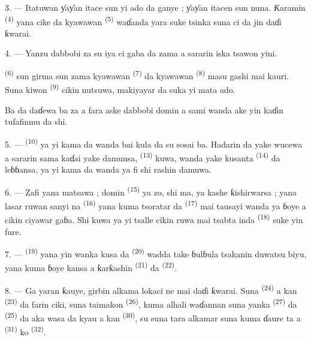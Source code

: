 3. --- Itatuwan ƴaƴan itace sun yi ado da ganye ; ƴaƴan itacen sun
nuna. Ƙaramin  \textsuperscript{(4)} yana cike da
kyawawan  \textsuperscript{(5)} waɗanda yara suke tsinka
suna ci da jin daɗi ƙwarai.

4. --- Yanzu dabbobi za su iya ci gaba da zama a sararin iska tsawon
yini.

 \textsuperscript{(6)} sun girma sun zama kyawawan
 \textsuperscript{(7)} da kyawawan 
\textsuperscript{(8)} masu gashi mai kauri. Suna kiwon 
 \textsuperscript{(9)} cikin nutsuwa, makiyayar da
 suka yi mata ado.

Ba da daɗewa ba za a fara aske  dabbobi domin a sami
 wanda ake yin kaɗin tufafinmu da shi.

\VUsaut{5.0mm}
\VUsaut{3.4mm}

5. ---  \textsuperscript{(10)} ya yi kama da wanda bai
kula da su sosai ba. Hadarin da yake wucewa a sararin sama kaɗai yake
damunsa,  \textsuperscript{(13)} kuwa, wanda
yake kusanta  \textsuperscript{(14)} da leɓɓansa, ya yi
kama da wanda ya fi shi rashin damuwa.

6. --- Zafi yana matsawa ; domin  \textsuperscript{(15)}
ya zo, shi ma, ya kashe ƙishirwarsa ; yana lasar ruwan sanyi na
 \textsuperscript{(16)} yana kuma tsoratar da
 \textsuperscript{(17)} mai tausayi wanda ya ɓoye a
cikin ciyawar gaɓa. Shi kuwa ya yi tsalle cikin ruwa mai tsabta inda
 \textsuperscript{(18)} suke yin fure.

7. ---  \textsuperscript{(19)} yana yin wanka
kusa da  \textsuperscript{(20)} wadda take
ɓulɓula tsakanin duwatsu biyu, yana kuma ɓoye kansa a ƙarƙashin
 \textsuperscript{(21)} da 
\textsuperscript{(22)}.

\VUsaut{5.0mm}
\VUsaut{3.4mm}

8. --- Ga yaran ƙauye, girbin alkama lokaci ne mai daɗi ƙwarai. Suna
\textsuperscript{(24)} a kan 
\textsuperscript{(23)} da farin ciki, suna taimakon 
\textsuperscript{(26)}, kuma alhali waɗannan suna yanka  \textsuperscript{(27)} da 
\textsuperscript{(25)} da aka wasa da kyau a kan 
\textsuperscript{(30)}, su suna tara alkamar suna kuma ɗaure ta a
 \textsuperscript{(31)} ko 
\textsuperscript{(32)}.

